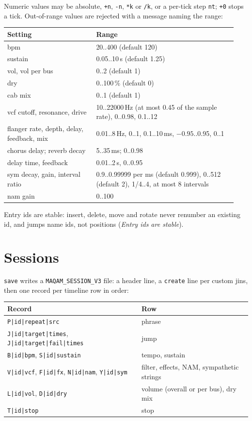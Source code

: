 \documentclass[11pt,oneside]{book}
\newcommand{\cmd}[1]{\texttt{#1}}
\begin{document}
Numeric values may be absolute, \cmd{+n}, \cmd{-n}, \cmd{*k} or \cmd{/k}, or a
per-tick step \cmd{nt}; \cmd{+0} stops a tick. Out-of-range values are rejected
with a message naming the range:

\begin{longtable}{p{0.36\linewidth}p{0.58\linewidth}}
\toprule
Setting & Range\\
\midrule
bpm & 20..400 (default 120)\\
sustain & 0.05..10\,s (default 1.25)\\
vol, vol per bus & 0..2 (default 1)\\
dry & 0..100\,\% (default 0)\\
cab mix & 0..1 (default 1)\\
vcf cutoff, resonance, drive & 10..22000\,Hz (at most 0.45 of the sample rate), 0..0.98, 0.1..12\\
flanger rate, depth, delay, feedback, mix & 0.01..8\,Hz, 0..1, 0.1..10\,ms, $-0.95$..0.95, 0..1\\
chorus delay; reverb decay & 5..35\,ms; 0..0.98\\
delay time, feedback & 0.01..2\,s, 0..0.95\\
sym decay, gain, interval ratio & 0.9..0.99999 per ms (default 0.999), 0..512 (default 2), 1/4..4, at most 8 intervals\\
nam gain & 0..100\\
\bottomrule
\end{longtable}

Entry ids are stable: insert, delete, move and rotate never renumber an
existing id, and jumps name ids, not positions (\emph{Entry ids are stable}).

\chapter{Sessions}
\cmd{save} writes a \texttt{MAQAM\_SESSION\_V3} file: a header line, a
\cmd{create} line per custom jins, then one record per timeline row in order:

\begin{center}\begin{tabular}{ll}
\toprule
Record & Row\\
\midrule
\texttt{P|id|repeat|src} & phrase\\
\texttt{J|id|target|times}, \texttt{J|id|target|fail|times} & jump\\
\texttt{B|id|bpm}, \texttt{S|id|sustain} & tempo, sustain\\
\texttt{V|id|vcf}, \texttt{F|id|fx}, \texttt{N|id|nam}, \texttt{Y|id|sym} & filter, effects, NAM, sympathetic strings\\
\texttt{L|id|vol}, \texttt{D|id|dry} & volume (overall or per bus), dry mix\\
\texttt{T|id|stop} & stop\\
\bottomrule
\end{tabular}\end{center}
\end{document}
